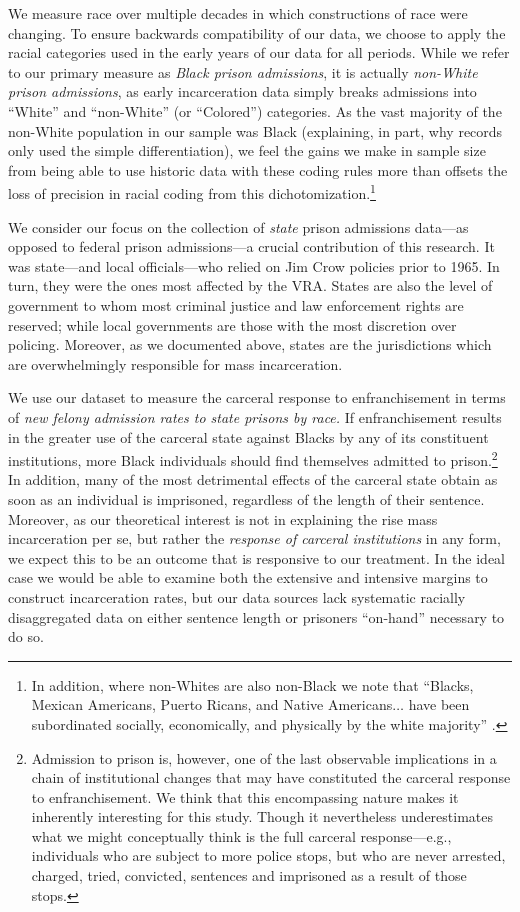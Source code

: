 \documentclass[12pt]{article}
\begin{document}
We measure race over multiple decades in which constructions of race were changing.  To ensure backwards compatibility of our data, we choose to apply the racial categories used in the early years of our data for all periods.  While we refer to our primary measure as \emph{Black prison admissions}, it is actually \emph{non-White prison admissions}, as early incarceration data simply breaks admissions into ``White'' and ``non-White'' (or ``Colored'') categories. As the vast majority of the non-White population in our sample was Black (explaining, in part, why records only used the simple differentiation), we feel the gains we make in sample size from being able to use historic data with these coding rules more than offsets the loss of precision in racial coding from this dichotomization.\footnote{In addition, where non-Whites are also non-Black we note that ``Blacks, Mexican Americans, Puerto Ricans, and Native Americans$\ldots$ have been subordinated socially, economically, and physically by the white majority''  \citep[10]{CivilRightsCommission:1975vd}.}

We consider our focus on the collection of \emph{state} prison admissions data---as opposed to federal prison admissions---a crucial contribution of this research.  It was state---and local officials---who relied on Jim Crow policies prior to 1965.  In turn, they were the ones most affected by the VRA.  States are also the level of government to whom most criminal justice and law enforcement rights are reserved; while local governments are those with the most discretion over policing.  Moreover, as we documented above, states are the jurisdictions which are overwhelmingly responsible for mass incarceration.

We use our dataset to measure the carceral response to enfranchisement in terms of \emph{new felony admission rates to state prisons by race.}   If enfranchisement results in the greater use of the carceral state against Blacks by any of its constituent institutions, more Black individuals should find themselves admitted to prison.\footnote{Admission to prison is, however, one of the last observable implications in a chain of institutional changes that may have constituted the carceral response to enfranchisement.  We think that this encompassing nature makes it inherently interesting for this study.  Though it nevertheless underestimates what we might conceptually think is the full carceral response---e.g., individuals who are subject to more police stops, but who are never arrested, charged, tried, convicted, sentences and imprisoned as a result of those stops.}  In addition, many of the most detrimental effects of the carceral state obtain as soon as an individual is imprisoned, regardless of the length of their sentence. Moreover, as our theoretical interest is not in explaining the rise mass incarceration per se, but rather the \emph{response of carceral institutions} in any form, we expect this to be an outcome that is responsive to our treatment.  In the ideal case we would be able to examine both the extensive and intensive margins to construct incarceration rates, but our data sources lack systematic racially disaggregated data on either sentence length or prisoners ``on-hand'' necessary to do so.
\end{document}
